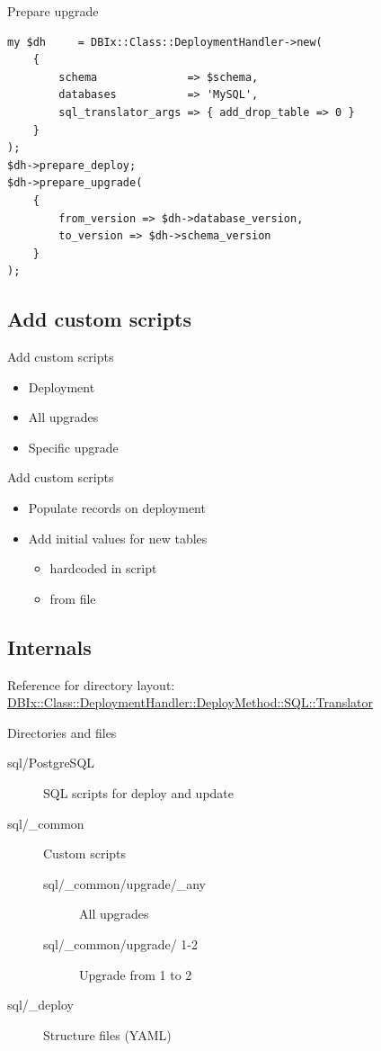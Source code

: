 \begin{frame}[fragile]{Prepare upgrade}
\begin{lstlisting}
my $dh     = DBIx::Class::DeploymentHandler->new(
    {
        schema              => $schema,
        databases           => 'MySQL',
        sql_translator_args => { add_drop_table => 0 }
    }
);
$dh->prepare_deploy;
$dh->prepare_upgrade(
    {
        from_version => $dh->database_version,
        to_version => $dh->schema_version
    }
);
\end{lstlisting}
\end{frame}

\subsection{Add custom scripts}

\begin{frame}{Add custom scripts}
\begin{itemize}
\item Deployment
\item All upgrades
\item Specific upgrade
\end{itemize}
\end{frame}

\begin{frame}{Add custom scripts}
\begin{itemize}
\item Populate records on deployment
\item Add initial values for new tables
\begin{itemize}
\item hardcoded in script
\item from file
\end{itemize}
\end{itemize}
\end{frame}

\subsection{Internals}

Reference for directory layout:
\href{https://metacpan.org/pod/DBIx::Class::DeploymentHandler::DeployMethod::SQL::Translator}{DBIx::Class::DeploymentHandler::DeployMethod::SQL::Translator}

\begin{frame}[fragile]{Directories and files}
\begin{description}
\item[sql/PostgreSQL] SQL scripts for deploy and update
\item[sql/\_common] Custom scripts
\begin{description}
\item[sql/\_common/upgrade/\_any] All upgrades
\item[sql/\_common/upgrade/ 1-2] Upgrade from 1 to 2
\end{description}
\item[sql/\_deploy] Structure files (YAML)
\end{description}
\end{frame}

